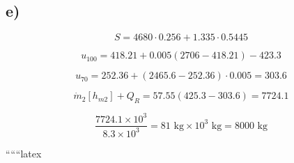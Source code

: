 

\subsection*{e)}

\[
S = 4680 \cdot 0.256 + 1.335 \cdot 0.5445
\]

\[
u_{100} = 418.21 + 0.005 \left( 2706 - 418.21 \right) - 423.3
\]

\[
u_{70} = 252.36 + \left( 2465.6 - 252.36 \right) \cdot 0.005 = 303.6
\]

\[
\dot{m}_2 \left[ h_{m2} \right] + Q_R = 57.55 \left( 425.3 - 303.6 \right) = 7724.1
\]

\[
\frac{7724.1 \times 10^3}{8.3 \times 10^3} = 81 \text{ kg} \times 10^3 \text{ kg} = 8000 \text{ kg}
\]

``````latex